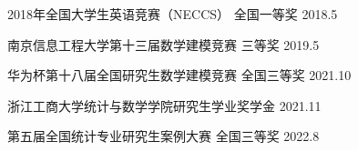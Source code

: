 



\begin{cvhonors}

  \cvhonor
    {2018年全国大学生英语竞赛（NECCS）} %
    {} %
    {全国一等奖} %
    {2018.5} %

  \cvhonor
    {南京信息工程大学第十三届数学建模竞赛} %
    {} %
    {三等奖} %
    {2019.5} %

\cvhonor
  {华为杯第十八届全国研究生数学建模竞赛} %
  {} %
  {全国三等奖} %
  {2021.10} %

\cvhonor
  {浙江工商大学统计与数学学院研究生学业奖学金} %
  {} %
  {} %
  {2021.11} %

  \cvhonor
    {第五届全国统计专业研究生案例大赛} %
    {} %
    {全国三等奖} %
    {2022.8} %



\end{cvhonors}




